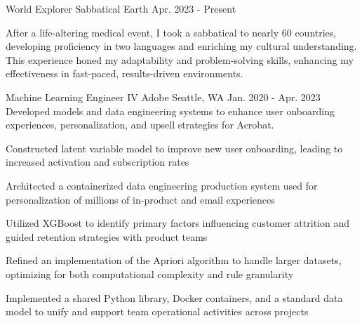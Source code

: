 
%
% 
% 
%
%
%
%
%
% 

\begin{cventries}

\cventry
    {World Explorer} %
    {Sabbatical} %
    {Earth} %
    {Apr. 2023 - Present} %
    {\parbox[t]{\linewidth}{After a life-altering medical event, I took a sabbatical to nearly 60 countries, developing proficiency in two languages and enriching my cultural understanding. This experience honed my adaptability and problem-solving skills, enhancing my effectiveness in fast-paced, results-driven environments.}} %
    {} %

\cventry
    {Machine Learning Engineer IV} %
    {Adobe} %
    {Seattle, WA} %
    {Jan. 2020 - Apr. 2023} %
    {Developed models and data engineering systems to enhance user onboarding experiences, personalization, and upsell strategies for Acrobat.} %
    {
      \begin{cvitems} %
        \item {Constructed latent variable model to improve new user onboarding, leading to increased activation and subscription rates}
        \item {Architected a containerized data engineering production system used for personalization of millions of in-product and email experiences}
        \item {Utilized XGBoost to identify primary factors influencing customer attrition and guided retention strategies with product teams}
        \item {Refined an implementation of the Apriori algorithm to handle larger datasets, optimizing for both computational complexity and rule granularity}
        \item {Implemented a shared Python library, Docker containers, and a standard data model to unify and support team operational activities across projects}
      \end{cvitems}
    }


\end{cventries}
